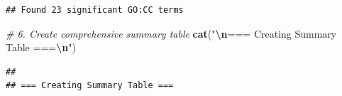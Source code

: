 \documentclass[
]{article}
\newenvironment{Shaded}{\begin{snugshade}}{\end{snugshade}}
\newcommand{\CommentTok}[1]{\textcolor[rgb]{0.56,0.35,0.01}{\textit{#1}}}
\newcommand{\FunctionTok}[1]{\textcolor[rgb]{0.13,0.29,0.53}{\textbf{#1}}}
\newcommand{\NormalTok}[1]{#1}
\newcommand{\SpecialCharTok}[1]{\textcolor[rgb]{0.81,0.36,0.00}{\textbf{#1}}}
\newcommand{\StringTok}[1]{\textcolor[rgb]{0.31,0.60,0.02}{#1}}
\begin{document}
\begin{verbatim}
## Found 23 significant GO:CC terms
\end{verbatim}

\begin{Shaded}
\begin{Highlighting}[]
\CommentTok{\# 6. Create comprehensive summary table}
\FunctionTok{cat}\NormalTok{(}\StringTok{"}\SpecialCharTok{\textbackslash{}n}\StringTok{=== Creating Summary Table ===}\SpecialCharTok{\textbackslash{}n}\StringTok{"}\NormalTok{)}
\end{Highlighting}
\end{Shaded}

\begin{verbatim}
## 
## === Creating Summary Table ===
\end{verbatim}
\end{document}
